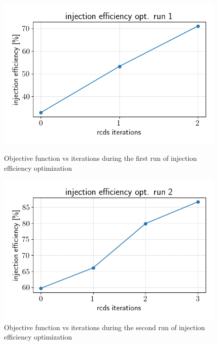 \begin{figure}
    \begin{minipage}{0.49\textwidth}
            \centering
            \includegraphics[width=\textwidth]{Images/injeff_hist_run1.png}
            \caption{Objective function vs iterations during the first run of injection efficiency optimization}
            \label{injeff_hist1}
    \end{minipage}
    \hfill
    \begin{minipage}{0.49\textwidth}
            \centering
            \includegraphics[width=\textwidth]{Images/injeff_hist_run2.png}
            \caption{Objective function vs iterations during the second run of injection efficiency optimization}
            \label{injeff_hist2}
        \end{minipage}
\end{figure}

